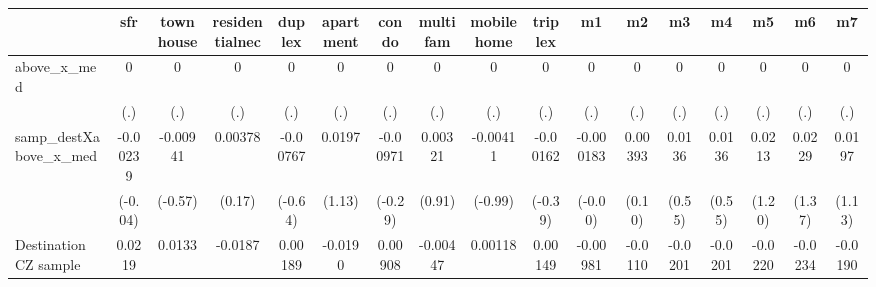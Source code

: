 \begin{table}[htbp]\centering
\def\sym#1{\ifmmode^{#1}\else\(^{#1}\)\fi}
\caption{ \label{tab1}}
\begin{tabular}{l*{16}{c}}
\toprule
                    &\multicolumn{1}{c}{sfr}&\multicolumn{1}{c}{townhouse}&\multicolumn{1}{c}{residentialnec}&\multicolumn{1}{c}{duplex}&\multicolumn{1}{c}{apartment}&\multicolumn{1}{c}{condo}&\multicolumn{1}{c}{multifam}&\multicolumn{1}{c}{mobilehome}&\multicolumn{1}{c}{triplex}&\multicolumn{1}{c}{m1}&\multicolumn{1}{c}{m2}&\multicolumn{1}{c}{m3}&\multicolumn{1}{c}{m4}&\multicolumn{1}{c}{m5}&\multicolumn{1}{c}{m6}&\multicolumn{1}{c}{m7}\\
\midrule
above\_x\_med         &           0         &           0         &           0         &           0         &           0         &           0         &           0         &           0         &           0         &           0         &           0         &           0         &           0         &           0         &           0         &           0         \\
                    &         (.)         &         (.)         &         (.)         &         (.)         &         (.)         &         (.)         &         (.)         &         (.)         &         (.)         &         (.)         &         (.)         &         (.)         &         (.)         &         (.)         &         (.)         &         (.)         \\
\addlinespace
samp\_destXabove\_x\_med&    -0.00239         &    -0.00941         &     0.00378         &    -0.00767         &      0.0197         &    -0.00971         &     0.00321         &    -0.00411         &    -0.00162         &   -0.000183         &     0.00393         &      0.0136         &      0.0136         &      0.0213         &      0.0229         &      0.0197         \\
                    &     (-0.04)         &     (-0.57)         &      (0.17)         &     (-0.64)         &      (1.13)         &     (-0.29)         &      (0.91)         &     (-0.99)         &     (-0.39)         &     (-0.00)         &      (0.10)         &      (0.55)         &      (0.55)         &      (1.20)         &      (1.37)         &      (1.13)         \\
\addlinespace
Destination CZ sample&      0.0219         &      0.0133         &     -0.0187         &     0.00189         &     -0.0190         &     0.00908         &    -0.00447         &     0.00118         &     0.00149         &    -0.00981         &     -0.0110         &     -0.0201         &     -0.0201         &     -0.0220         &     -0.0234         &     -0.0190         \\

\end{tabular}
\end{table}
